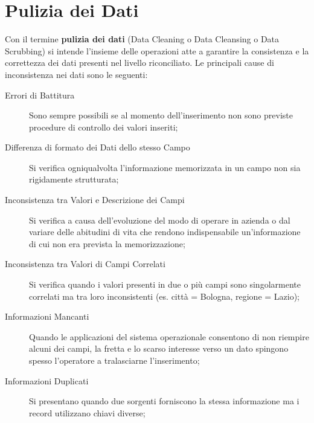 \section{Pulizia dei Dati}\label{sec:db_pulizia_dei_dati} %
Con il termine \textbf{pulizia dei dati} (Data Cleaning o Data Cleansing o Data Scrubbing) si intende l'insieme delle operazioni atte a garantire la consistenza e la correttezza dei dati presenti nel livello riconciliato.
Le principali cause di inconsistenza nei dati sono le seguenti:
\begin{description}
    \item[Errori di Battitura] Sono sempre possibili se al momento dell'inserimento non sono previste procedure di controllo dei valori inseriti;
    \item[Differenza di formato dei Dati dello stesso Campo] Si verifica ogniqualvolta l'informazione memorizzata in un campo non sia rigidamente strutturata;
    \item[Inconsistenza tra Valori e Descrizione dei Campi] Si verifica a causa dell'evoluzione del modo di operare in azienda o dal variare delle abitudini di vita che rendono indispensabile un'informazione di cui non era prevista la memorizzazione;
    \item[Inconsistenza tra Valori di Campi Correlati] Si verifica quando i valori presenti in due o più campi sono singolarmente correlati ma tra loro inconsistenti (es. città = Bologna, regione = Lazio);
    \item[Informazioni Mancanti] Quando le applicazioni del sistema operazionale consentono di non riempire alcuni dei campi, la fretta e lo scarso interesse verso un dato spingono spesso l'operatore a tralasciarne l'inserimento;
    \item[Informazioni Duplicati] Si presentano quando due sorgenti forniscono la stessa informazione ma i record utilizzano chiavi diverse;
\end{description}
%
